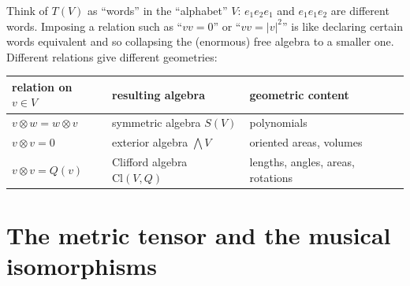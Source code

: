 \documentclass[11pt,a4paper]{article}
\numberwithin{equation}{section}
\theoremstyle{definition}
\theoremstyle{plain}
\newcommand{\Cl}{\mathrm{Cl}}
\begin{document}
\begin{intuition}
Think of $T(V)$ as ``words'' in the ``alphabet'' $V$: $e_1e_2e_1$ and $e_1e_1e_2$ are different words.
Imposing a relation such as ``$vv=0$'' or ``$vv=|v|^2$'' is like declaring certain words equivalent and so
collapsing the (enormous) free algebra to a smaller one. Different relations give different geometries:
\begin{center}
\begin{tabular}{lll}
relation on $v\in V$ & resulting algebra & geometric content\\\hline
$v\otimes w=w\otimes v$ & symmetric algebra $S(V)$ & polynomials\\
$v\otimes v=0$ & exterior algebra $\bigwedge V$ & oriented areas, volumes\\
$v\otimes v=Q(v)$ & Clifford algebra $\Cl(V,Q)$ & lengths, angles, areas, rotations
\end{tabular}
\end{center}
\end{intuition}


\section{The metric tensor and the musical isomorphisms}\label{sec:metric}
\end{document}
